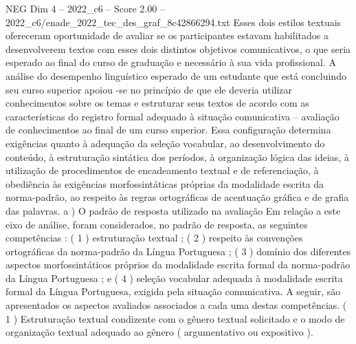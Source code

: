 \begin{textsample}{NEG Dim 4 – 2022\_c6 – Score 2.00 – 2022\_c6/enade\_2022\_tec\_des\_graf\_8c42866294.txt}
Esses dois estilos textuais ofereceram oportunidade de avaliar se os participantes estavam habilitados a desenvolverem textos com esses dois distintos objetivos comunicativos, o que seria esperado ao final do curso de graduação e necessário à sua vida profissional.
A análise do desempenho linguístico esperado de um estudante que está concluindo seu curso superior apoiou -se no princípio de que ele deveria utilizar conhecimentos sobre os temas e estruturar seus textos de acordo com as características do registro formal adequado à situação comunicativa – avaliação de conhecimentos ao final de um curso superior.
Essa configuração determina exigências quanto à adequação da seleção vocabular, ao desenvolvimento do conteúdo, à estruturação sintática dos períodos, à organização lógica das ideias, à utilização de procedimentos de encadeamento textual e de referenciação, à obediência às exigências morfossintáticas próprias da modalidade escrita da norma-padrão, ao respeito às regras ortográficas de acentuação gráfica e de grafia das palavras. a ) O padrão de resposta utilizado na avaliação Em relação a este eixo de análise, foram considerados, no padrão de resposta, as seguintes competências : ( 1 ) estruturação textual ; ( 2 ) respeito às convenções ortográficas da norma-padrão da Língua Portuguesa ; ( 3 ) domínio dos diferentes aspectos morfossintáticos próprios da modalidade escrita formal da norma-padrão da Língua Portuguesa ; e ( 4 ) seleção vocabular adequada à modalidade escrita formal da Língua Portuguesa, exigida pela situação comunicativa.
A seguir, são apresentados os aspectos avaliados associados a cada uma destas competências. ( 1 ) Estruturação textual condizente com o gênero textual solicitado e o modo de organização textual adequado ao gênero ( argumentativo ou expositivo ).

\end{textsample}

